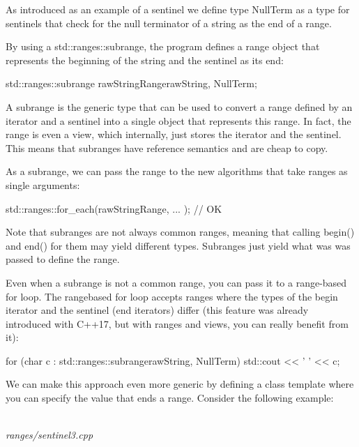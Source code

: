 As introduced as an example of a sentinel we define type NullTerm as a type for sentinels that check for the null terminator of a string as the end of a range.

By using a std::ranges::subrange, the program defines a range object that represents the beginning of the string and the sentinel as its end:

\begin{cpp}
std::ranges::subrange rawStringRange{rawString, NullTerm{}};
\end{cpp}

A subrange is the generic type that can be used to convert a range defined by an iterator and a sentinel into a single object that represents this range. In fact, the range is even a view, which internally, just stores the iterator and the sentinel. This means that subranges have reference semantics and are cheap to copy.

As a subrange, we can pass the range to the new algorithms that take ranges as single arguments:

\begin{cpp}
std::ranges::for_each(rawStringRange, ... ); // OK
\end{cpp}

Note that subranges are not always common ranges, meaning that calling begin() and end() for them may yield different types. Subranges just yield what was was passed to define the range.

Even when a subrange is not a common range, you can pass it to a range-based for loop. The rangebased for loop accepts ranges where the types of the begin iterator and the sentinel (end iterators) differ (this feature was already introduced with C++17, but with ranges and views, you can really benefit from it):

\begin{cpp}
for (char c : std::ranges::subrange{rawString, NullTerm{}}) {
	std::cout << ' ' << c;
}
\end{cpp}

We can make this approach even more generic by defining a class template where you can specify the value that ends a range. Consider the following example:

\noindent
\hspace*{\fill} \\ %
\textit{ranges/sentinel3.cpp}

